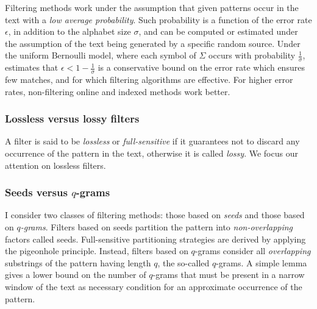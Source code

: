 Filtering methods work under the assumption that given patterns occur in the text with a \emph{low average probability}.
Such probability is a function of the error rate $\epsilon$, in addition to the alphabet size $\sigma$, and can be computed or estimated under the assumption of the text being generated by a specific random source.
Under the uniform Bernoulli model, where each symbol of $\Sigma$ occurs with probability $\frac{1}{\sigma}$, \citet{Navarro2000} estimates that $\epsilon < 1 - \frac{1}{\sigma}$ is a conservative bound on the error rate which ensures few matches, and for which filtering algorithms are effective.
For higher error rates, non-filtering online and indexed methods work better.

\subsubsection{Lossless versus lossy filters}

A filter is said to be \emph{lossless} or \emph{full-sensitive} if it guarantees not to discard any occurrence of the pattern in the text, otherwise it is called \emph{lossy}.
We focus our attention on lossless filters.

\subsubsection{Seeds versus $q$-grams}

I consider two classes of filtering methods: those based on \emph{seeds} and those based on \emph{$q$-grams}.
Filters based on seeds partition the pattern into \emph{non-overlapping} factors called seeds.
Full-sensitive partitioning strategies are derived by applying the pigeonhole principle.
Instead, filters based on $q$-grams consider all \emph{overlapping} substrings of the pattern having length $q$, the so-called $q$-grams.
A simple lemma gives a lower bound on the number of $q$-grams that must be present in a narrow window of the text as necessary condition for an approximate occurrence of the pattern.
